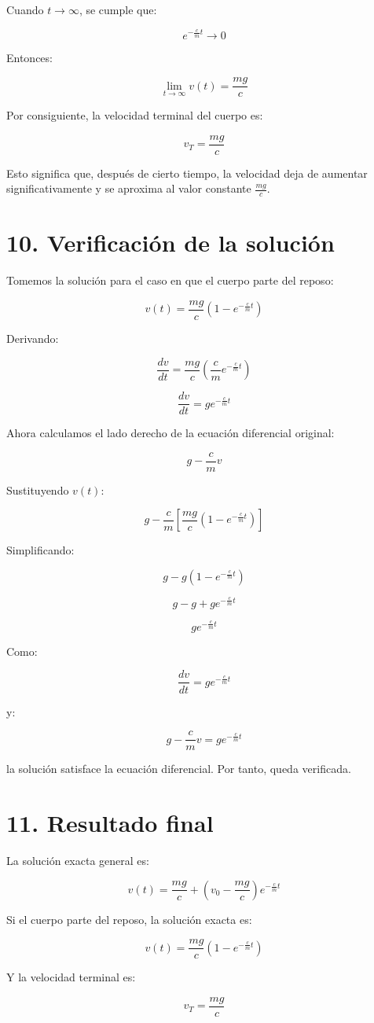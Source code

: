 \documentclass[12pt,letterpaper]{article}
\begin{document}
Cuando \(t\to\infty\), se cumple que:

\[
e^{-\frac{c}{m}t}\to 0
\]

Entonces:

\[
\lim_{t\to\infty}v(t)=\frac{mg}{c}
\]

Por consiguiente, la velocidad terminal del cuerpo es:

\[
\boxed{v_T=\frac{mg}{c}}
\]

Esto significa que, después de cierto tiempo, la velocidad deja de aumentar significativamente y se aproxima al valor constante \(\frac{mg}{c}\).

\section*{10. Verificación de la solución}

Tomemos la solución para el caso en que el cuerpo parte del reposo:

\[
v(t)=\frac{mg}{c}\left(1-e^{-\frac{c}{m}t}\right)
\]

Derivando:

\[
\frac{dv}{dt}=\frac{mg}{c}\left(\frac{c}{m}e^{-\frac{c}{m}t}\right)
\]

\[
\frac{dv}{dt}=ge^{-\frac{c}{m}t}
\]

Ahora calculamos el lado derecho de la ecuación diferencial original:

\[
g-\frac{c}{m}v
\]

Sustituyendo \(v(t)\):

\[
g-\frac{c}{m}\left[\frac{mg}{c}\left(1-e^{-\frac{c}{m}t}\right)\right]
\]

Simplificando:

\[
g-g\left(1-e^{-\frac{c}{m}t}\right)
\]

\[
g-g+ge^{-\frac{c}{m}t}
\]

\[
ge^{-\frac{c}{m}t}
\]

Como:

\[
\frac{dv}{dt}=ge^{-\frac{c}{m}t}
\]

y:

\[
g-\frac{c}{m}v=ge^{-\frac{c}{m}t}
\]

la solución satisface la ecuación diferencial. Por tanto, queda verificada.

\section*{11. Resultado final}

La solución exacta general es:

\[
\boxed{v(t)=\frac{mg}{c}+\left(v_0-\frac{mg}{c}\right)e^{-\frac{c}{m}t}}
\]

Si el cuerpo parte del reposo, la solución exacta es:

\[
\boxed{v(t)=\frac{mg}{c}\left(1-e^{-\frac{c}{m}t}\right)}
\]

Y la velocidad terminal es:

\[
\boxed{v_T=\frac{mg}{c}}
\]
\end{document}
